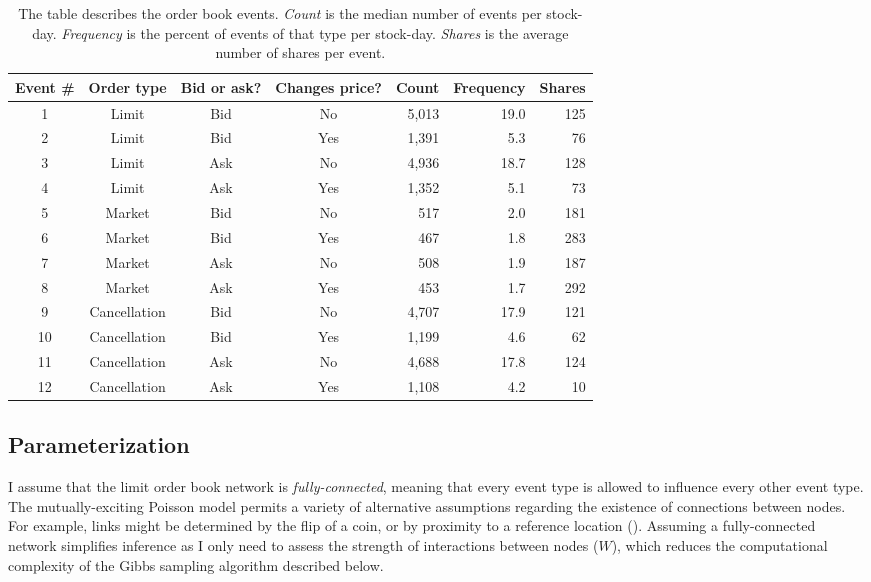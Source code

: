 		\begin{table}[t]
			\small
			\linespread{1}
			\centering
			\begin{tabular*}{\textwidth}{@{\extracolsep{\fill}}ccccrrr}
			\toprule
			Event \# & Order type & Bid or ask? & Changes price? & Count & Frequency & Shares \\
			\midrule
			1 & Limit & Bid & No & 5,013 & 19.0 & 125 \\
			2 & Limit & Bid & Yes & 1,391 & 5.3 & 76 \\
			3 & Limit & Ask & No & 4,936 & 18.7 & 128 \\
			4 & Limit & Ask & Yes & 1,352 & 5.1 & 73 \\  %
			5 & Market & Bid & No & 517 & 2.0 & 181 \\   %
			6 & Market & Bid & Yes & 467 & 1.8 & 283 \\  %
			7 & Market & Ask & No & 508 & 1.9 & 187 \\   %
			8 & Market & Ask & Yes & 453 & 1.7 & 292 \\
			9 & Cancellation & Bid & No & 4,707 & 17.9 & 121 \\
			10 & Cancellation & Bid & Yes & 1,199 & 4.6 & 62 \\
			11 & Cancellation & Ask & No & 4,688 & 17.8 & 124 \\
			12 & Cancellation & Ask & Yes & 1,108 & 4.2 & 10 \\
			\bottomrule
			\end{tabular*}
			\captionsetup{position=below, font=footnotesize, justification=justified, width=\linewidth}
			\caption[Order book event definitions]{The table describes the order book events. \textit{Count} is the median number of events per stock-day. \textit{Frequency} is the percent of events of that type per stock-day. \textit{Shares} is the average number of shares per event.}
			\label{tab:event_definitions}
		\end{table}

	\subsection{Parameterization}
		I assume that the limit order book network is \textit{fully-connected}, meaning that every event type is allowed to influence every other event type. The mutually-exciting Poisson model permits a variety of alternative assumptions regarding the existence of connections between nodes. For example, links might be determined by the flip of a coin, or by proximity to a reference location (\cite{Linderman2015}). Assuming a fully-connected network simplifies inference as I only need to assess the strength of interactions between nodes ($W$), which reduces the computational complexity of the Gibbs sampling algorithm described below.

